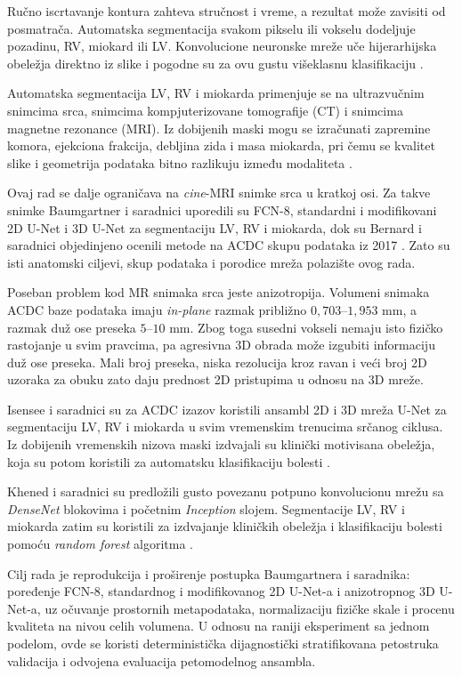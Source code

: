 \documentclass[11pt,a4paper]{article}
\begin{document}
Ručno iscrtavanje kontura zahteva stručnost i vreme, a rezultat može zavisiti od posmatrača.
Automatska segmentacija svakom pikselu ili vokselu dodeljuje pozadinu, RV, miokard ili LV.
Konvolucione neuronske mreže uče hijerarhijska obeležja direktno iz slike i pogodne su za ovu gustu
višeklasnu klasifikaciju \cite{litjens2017}.

Automatska segmentacija LV, RV i miokarda primenjuje se na ultrazvučnim snimcima srca, snimcima
kompjuterizovane tomografije (CT) i snimcima magnetne rezonance (MRI). Iz dobijenih maski mogu se
izračunati zapremine komora, ejekciona frakcija, debljina zida i masa miokarda, pri čemu se kvalitet
slike i geometrija podataka bitno razlikuju između modaliteta \cite{chen2020}.

Ovaj rad se dalje ograničava na \textit{cine}-MRI snimke srca u kratkoj osi. Za takve snimke
Baumgartner i saradnici uporedili su FCN-8, standardni i modifikovani 2D U-Net i 3D U-Net za
segmentaciju LV, RV i miokarda, dok su Bernard i saradnici objedinjeno ocenili metode na ACDC skupu
podataka iz 2017 \cite{baumgartner2017,bernard2018}. Zato su isti anatomski ciljevi, skup podataka i porodice
mreža polazište ovog rada.

Poseban problem kod MR snimaka srca jeste anizotropija. Volumeni snimaka ACDC baze podataka imaju \textit{in-plane} razmak
približno $0{,}703$--$1{,}953$ mm, a razmak duž ose preseka $5$--$10$ mm. Zbog toga susedni vokseli
nemaju isto fizičko rastojanje u svim pravcima, pa agresivna 3D obrada može izgubiti informaciju
duž ose preseka. Mali broj preseka, niska rezolucija kroz ravan i veći broj 2D uzoraka za obuku
zato daju prednost 2D pristupima u odnosu na 3D mreže.

Isensee i saradnici su za ACDC izazov koristili ansambl 2D i 3D mreža U-Net za segmentaciju LV, RV i
miokarda u svim vremenskim trenucima srčanog ciklusa. Iz dobijenih vremenskih nizova maski izdvajali
su klinički motivisana obeležja, koja su potom koristili za automatsku klasifikaciju bolesti
\cite{isensee2018}.

Khened i saradnici su predložili gusto povezanu potpuno konvolucionu mrežu sa \textit{DenseNet}
blokovima i početnim \textit{Inception} slojem. Segmentacije LV, RV i miokarda zatim su koristili za
izdvajanje kliničkih obeležja i klasifikaciju bolesti pomoću \textit{random forest} algoritma
\cite{khened2018}.

Cilj rada je reprodukcija i proširenje postupka Baumgartnera i saradnika: poređenje FCN-8, standardnog i modifikovanog
2D U-Net-a i anizotropnog 3D U-Net-a, uz očuvanje prostornih metapodataka, normalizaciju fizičke
skale i procenu kvaliteta na nivou celih volumena. U odnosu na raniji eksperiment sa jednom
podelom, ovde se koristi deterministička dijagnostički stratifikovana petostruka validacija i
odvojena evaluacija petomodelnog ansambla.
\end{document}
